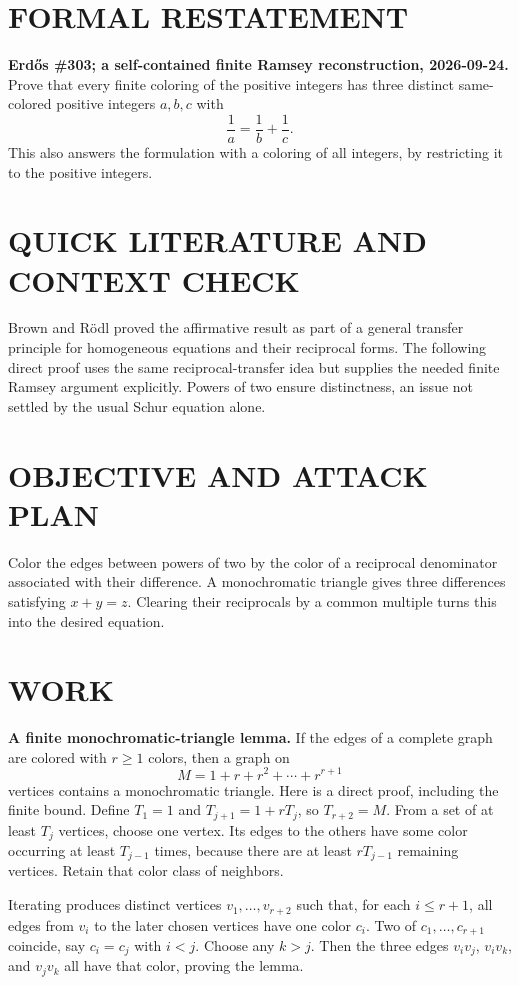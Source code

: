 \section{FORMAL RESTATEMENT}
\textbf{Erd\H{o}s \#303; a self-contained finite Ramsey reconstruction, 2026-09-24.}
Prove that every finite coloring of the positive integers has three distinct same-colored positive integers $a,b,c$ with
\[
\frac1a=\frac1b+\frac1c.
\]
This also answers the formulation with a coloring of all integers, by restricting it to the positive integers.

\section{QUICK LITERATURE AND CONTEXT CHECK}
Brown and R\"odl proved the affirmative result as part of a general transfer principle for homogeneous equations and their reciprocal forms. The following direct proof uses the same reciprocal-transfer idea but supplies the needed finite Ramsey argument explicitly. Powers of two ensure distinctness, an issue not settled by the usual Schur equation alone.

\section{OBJECTIVE AND ATTACK PLAN}
Color the edges between powers of two by the color of a reciprocal denominator associated with their difference. A monochromatic triangle gives three differences satisfying $x+y=z$. Clearing their reciprocals by a common multiple turns this into the desired equation.

\section{WORK}
\textbf{A finite monochromatic-triangle lemma.} If the edges of a complete graph are colored with $r\geq1$ colors, then a graph on
\[
M=1+r+r^2+\cdots+r^{r+1}
\tag{1}
\]
vertices contains a monochromatic triangle. Here is a direct proof, including the finite bound. Define $T_1=1$ and $T_{j+1}=1+rT_j$, so $T_{r+2}=M$. From a set of at least $T_j$ vertices, choose one vertex. Its edges to the others have some color occurring at least $T_{j-1}$ times, because there are at least $rT_{j-1}$ remaining vertices. Retain that color class of neighbors.

Iterating produces distinct vertices $v_1,\ldots,v_{r+2}$ such that, for each $i\leq r+1$, all edges from $v_i$ to the later chosen vertices have one color $c_i$. Two of $c_1,\ldots,c_{r+1}$ coincide, say $c_i=c_j$ with $i<j$. Choose any $k>j$. Then the three edges $v_iv_j$, $v_iv_k$, and $v_jv_k$ all have that color, proving the lemma.

